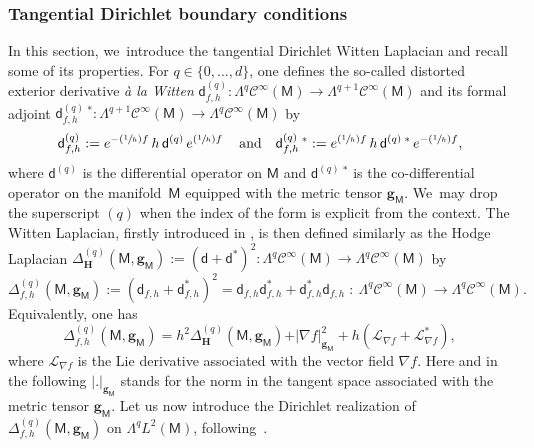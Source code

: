 \documentclass[JEP,XML,SOM,Unicode,NoEqCountersInSection,NoFloatCountersInSection,published]{cedram}
\newcommand{\Psfrac}[2]{(\sfrac{#1}{#2})}
\newcommand{\quand}{\quad\text{and}\quad}
\newcommand{\mbf}[1]{\mathbf{#1}}
\theoremstyle{plain}
\theoremstyle{definition}
\begin{document}
\subsubsection{Tangential Dirichlet boundary conditions}
\label{sec:LD}
In this section, we~introduce the tangential Dirichlet Witten Laplacian and recall some of its properties.
For $q\in\{0,\dots,d\}$, one defines the so-called distorted exterior
derivative \textit{\`a la Witten} $\mathsf d_{f,h}^{(q)}:\Lambda^{q}
\mathcal C^{\infty}(\mathsf M)\to \Lambda^{q+1} \mathcal
C^{\infty}(\mathsf M)$ and its formal adjoint
$\mathsf d_{f,h}^{(q)} \,^{*}:\Lambda^{q+1} \mathcal
C^{\infty}(\mathsf M)\to \Lambda^{q} \mathcal C^{\infty}(\mathsf M)$ by
\[
\mathsf d_{f,h}^{(q)}:= e^{-\Psfrac{1}{h}f}\, h\, \mathsf d^{(q)} \, e^{\Psfrac{1}{h}f} \, \quand \mathsf d_{f,h}^{(q)}\,^{*}:= e^{\Psfrac{1}{h}f}\,h\,\mathsf d^{(q)}\,^{*}\,e^{-\Psfrac{1}{h}f},
\]
where $\mathsf d^{(q)}$ is the differential operator on $\mathsf M$
and $\mathsf d^{(q)}\,^{*}$ is the co-differential operator on the
manifold~$\mathsf M$ equipped with the metric tensor $\mbf g_{\mathsf
M}$. We~may drop the superscript $(q)$ when the index of the form is
explicit from the context.
The Witten Laplacian, firstly introduced in \cite{witten-82},
is then defined similarly as the Hodge Laplacian $\Delta^{(q)}_{\mbf
H}(\mathsf M,\mbf g_{\mathsf M}):=(\mathsf d+\mathsf
d^*)^2:\Lambda^{q} \mathcal C^{\infty}(\mathsf M)\to \Lambda^{q}
\mathcal C^{\infty}(\mathsf M)$ by
\[
\Delta_{f,h}^{(q)} (\mathsf M,\mbf g_{\mathsf M}):= (\mathsf d_{f,h}+ \mathsf d_{f,h}^*)^2= \mathsf d_{f,h}\mathsf d^{*}_{f,h}+\mathsf d^{*}_{f,h}\mathsf d_{f,h}\;:\ \Lambda^{q} \mathcal C^{\infty}(\mathsf M)\to \Lambda^{q} \mathcal C^{\infty}(\mathsf M).
\]
Equivalently, one has
\begin{equation}\label{dec.delta}
\Delta_{f,h}^{(q)} (\mathsf M,\mbf g_{\mathsf M})=h^2\Delta_{\mbf H}^{(q)}(\mathsf M,\mbf g_{\mathsf M})+\vert \nabla f \vert_{\mbf g_{\mathsf M}}^2+h(\mathcal L_{\nabla f} + \mathcal L_{\nabla f}^*),
\end{equation}
where $\mathcal L_{\nabla f}$ is the Lie derivative associated with
the vector field ${\nabla f}$. Here and in the following $\vert. \vert_{\mbf g_{\mathsf M}} $ stands for the norm in the
tangent space associated with the metric tensor $\mbf g_{\mathsf M}$.
Let us now introduce the Dirichlet realization of
$\Delta_{f,h}^{(q)}(\mathsf M,\mbf g_{\mathsf M})$ on $\Lambda^{q}
L^{2}(\mathsf M)$, following~\cite[\S2.4]{helffer-nier-06}.
\end{document}
